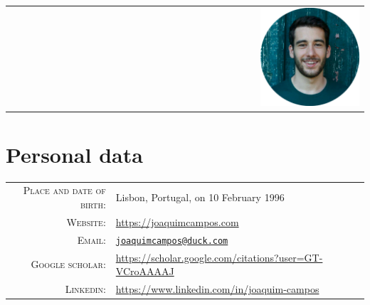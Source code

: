 \documentclass[a4paper,11pt]{article}
\begin{document}
  \pagestyle{empty}


  \begin{center}
    \begin{tabular}{lcr}
	    \par{\centering{\Huge Joaquim \textsc{Campos}}\bigskip\par} & & \includegraphics[width=0.3\textwidth]{../../images/Joaquim_circle.png} \\
    \end{tabular}
  \end{center}

  \vspace{15pt}

  \section{Personal data}

    \begin{tabular}{rl}
      \textsc{Place and date of birth:} & Lisbon, Portugal, on 10 February 1996 \\
      \textsc{Website:} & \url{https://joaquimcampos.com} \\
      \textsc{Email:} & \href{mailto:joaquimcampos@duck.com}{\nolinkurl{joaquimcampos@duck.com}} \\
      \textsc{Google scholar:} & \url{https://scholar.google.com/citations?user=GT-VCroAAAAJ} \\
      \textsc{Linkedin:} & \url{https://www.linkedin.com/in/joaquim-campos} \\
    \end{tabular}
\end{document}
